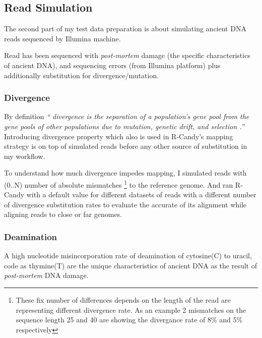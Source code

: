 \documentclass[11pt,a4paper]{report}
\newcommand{\quotes}[1]{``#1''}
\begin{document}
\subsection{Read Simulation}

The second part of my test data preparation is about simulating ancient DNA reads 
sequenced by Illumina machine.

Read has been sequenced with \emph{post-mortem }damage \cite{damagepattern} (the 
specific characteristics of ancient DNA), and sequencing errors \cite{phred1} (from
Illumina platform) plus additionally substitution for divergence/mutation.


\subsubsection{Divergence}

By definition \emph{\quotes{ divergence is the separation
of a population's gene pool from the gene pools of other populations 
due to mutation, genetic drift, and selection \cite{divergence1}.}}\\

Introducing divergence property which also is used in R-Candy's mapping strategy 
is on top of simulated reads before any other source of substitution in my workflow. 

To understand how much divergence impedes mapping, I simulated reads with (0..N) 
number of absolute mismatches \footnote {These fix number of differences depends 
on the length of the read are representing different divergence rate. As an example 
2 mismatches on the sequence length 25 and 40 are showing the divergance rate of 8\% 
and 5\% respectively} to the reference genome.
And ran R-Candy with a default value for different datasets of reads with a 
different number of divergence substitution rates to evaluate the accurate of its 
alignment while aligning reads to close or far genomes.

\subsubsection{Deamination}

A high nucleotide misincorporation rate of  deamination of cytosine(C) to uracil, 
code as thymine(T) are the unique characteristics of ancient DNA as the result 
of \emph{post-mortem} DNA damage\cite{mapdamage2}\cite{damagepattern}.\\ 
\end{document}
